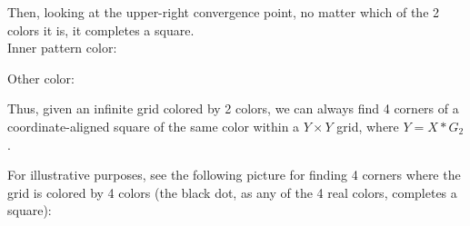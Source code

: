 \documentclass[11pt]{article}
\newcommand*{\scalePic}{0.4}
\newcommand*{\gridArg}[7]{%
    \foreach \x in {\fpeval{#1},\fpeval{#1+#2},...,\fpeval{#3+0.0001}} %
        \draw [black, thin, #7] (\x,\fpeval{#4}) -- (\x,\fpeval{#6+0.0001});
    \foreach \y in {\fpeval{#4},\fpeval{#4+#5},...,\fpeval{#6+0.0001}}
        \draw [black, thin, #7] (\fpeval{#1},\y) -- (\fpeval{#3+0.0001},\y);
}
\newcommand*{\grid}[6]{\gridArg{#1}{#2}{#3}{#4}{#5}{#6}{}}%
\newcommand*{\mybigbox}[4]{\grid{#1}{#3}{#1+#3}{#2}{#4}{#2+#4}} %
\newcommand*{\point}[3]{\node at (#1 + 0.5, #2 + 0.5)[circle, fill, inner sep=\scalePic*5pt, #3]{}; \gridArg{#1}{1}{#1+1}{#2}{1}{#2+1}{draw=none}}
\newcommand*{\red}{red!80!blue}
\newcommand*{\blue}{blue!60!green}
\newcommand{\echoWithinShell}[1]{ ( echo \\\\\\\\begin\\{lstlisting\\}\\[breaklines\\] && echo #1 && echo \\\\\\\\end\\{lstlisting\\} ) }
\newcommand{\shellRun}[2] {%
   && \echoWithinShell{\\ #1} && \echoWithinShell{\\ $OUTPUT} ) }%
}
\newcommand{\cppRun}[2]{%
  \shellRun{#1 #2}{run}
}
\begin{document}
Then, looking at the upper-right convergence point, no matter which of the 2 colors it is, it completes a square.\\

Inner pattern color:
\begin{center}
\end{center}

\pagebreak
Other color:
\begin{center}
\end{center}

Thus, given an infinite grid colored by 2 colors, we can always find 4 corners of a coordinate-aligned square of the same color within a $Y \times Y$ grid, where $Y = X * G_{2}$.

For illustrative purposes, see the following picture for finding 4 corners where the grid is colored by 4 colors (the black dot, as any of the 4 real colors, completes a square):
\begin{center}
\end{center}
\end{document}
